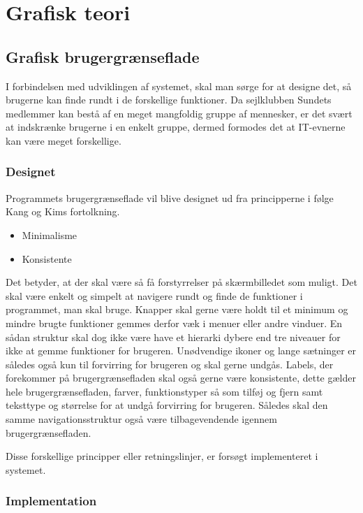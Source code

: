 \chapter{Grafisk teori}
\section{Grafisk brugergrænseflade} \label{chap:GUI}

I forbindelsen med udviklingen af systemet, skal man sørge for at designe det, så brugerne kan finde rundt i de forskellige funktioner. 
Da sejlklubben Sundets medlemmer kan bestå af en meget mangfoldig gruppe af mennesker, er det svært at indskrænke brugerne i en enkelt gruppe, dermed formodes det at IT-evnerne kan være meget forskellige.


\subsection{Designet} \label{sec:Designet}

Programmets brugergrænseflade vil blive designet ud fra principperne i følge Kang og Kims fortolkning. \citep{gui1} 

\begin{itemize}
	\item Minimalisme
	\item Konsistente
\end{itemize}

Det betyder, at der skal være så få forstyrrelser på skærmbilledet som muligt. 
Det skal være enkelt og simpelt at navigere rundt og finde de funktioner i programmet, man skal bruge. Knapper skal gerne være holdt til et minimum og mindre brugte funktioner gemmes derfor væk i menuer eller andre vinduer.
En sådan struktur skal dog ikke være have et hierarki dybere end tre niveauer for ikke at gemme funktioner for brugeren.
Unødvendige ikoner og lange sætninger er således også kun til forvirring for brugeren og skal gerne undgås.
Labels, der forekommer på brugergrænsefladen skal også gerne være konsistente, dette gælder hele brugergrænsefladen, farver, funktionstyper så som tilføj og fjern samt teksttype og størrelse for at undgå forvirring for brugeren. 
Således skal den samme navigationsstruktur også være tilbagevendende igennem brugergrænsefladen.

Disse forskellige principper eller retningslinjer, er forsøgt implementeret i systemet.

\subsection{Implementation}\label{sec:Implementation}


